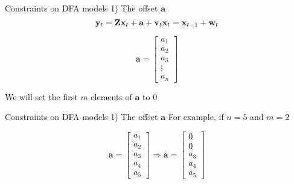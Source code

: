\documentclass[
  ignorenonframetext,
]{beamer}
\begin{document}
\begin{frame}{Constraints on DFA models \textbar{} 1) The offset
\(\mathbf{a}\)}
\protect\hypertarget{constraints-on-dfa-models-1-the-offset-mathbfa-1}{}
\[
\mathbf{y}_t = \mathbf{Z} \mathbf{x}_t + \mathbf{a} + \mathbf{v}_t \\
\mathbf{x}_t = \mathbf{x}_{t-1} + \mathbf{w}_t
\]

\[
\mathbf{a} =
\begin{bmatrix}
 a_1 \\
 a_2 \\
 a_3 \\
 \vdots \\
 a_n
\end{bmatrix}
\]

We will set the first \(m\) elements of \(\mathbf{a}\) to 0
\end{frame}

\begin{frame}{Constraints on DFA models \textbar{} 1) The offset
\(\mathbf{a}\)}
\protect\hypertarget{constraints-on-dfa-models-1-the-offset-mathbfa-2}{}
For example, if \(n = 5\) and \(m = 2\)

\[
\mathbf{a} =
\begin{bmatrix}
 a_1 \\
 a_2 \\
 a_3 \\
 a_4 \\
 a_5
\end{bmatrix}
\Rightarrow
\mathbf{a} =
\begin{bmatrix}
 0 \\
 0 \\
 a_3 \\
 a_4 \\
 a_5
\end{bmatrix}
\]
\end{frame}
\end{document}

